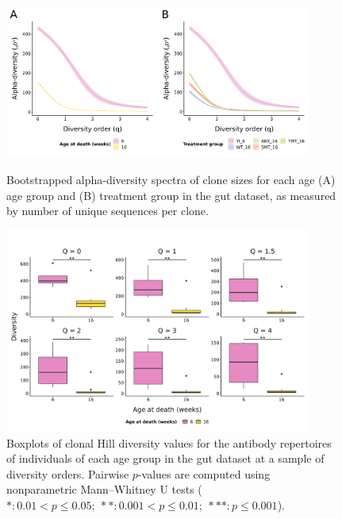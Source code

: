 \begin{figure}
\centering
\includegraphics[width = 0.9\textwidth]{_Figures/png/igseq-gut-clone-diversity-alpha}
\begin{subfigure}{0em}
\label{fig:igseq-gut-clone-diversity-alpha-age}
\end{subfigure}
\begin{subfigure}{0em}
\label{fig:igseq-gut-clone-diversity-alpha-groups}
\end{subfigure}
\caption{Bootstrapped alpha-diversity spectra of clone sizes for each age (A) age group and (B) treatment group in the \igseq gut dataset, as measured by number of unique sequences per clone.}
\label{fig:igseq-gut-clone-diversity-alpha}
\end{figure}

\begin{figure}
\centering
\includegraphics[width = 0.9\textwidth]{_Figures/png/igseq-gut-clone-diversity-solo-age}
\caption{Boxplots of clonal Hill diversity values for the antibody repertoires of individuals of each age group in the \igseq gut dataset at a sample of diversity orders. Pairwise $p$-values are computed using nonparametric Mann–Whitney U tests ($*: 0.01 < p \leq 0.05;~**: 0.001 < p \leq 0.01;~***: p \leq 0.001$).}
\label{fig:igseq-gut-clone-diversity-solo-age}
\end{figure}

